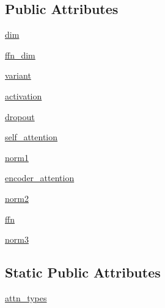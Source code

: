 \subsection*{Public Attributes}
\begin{DoxyCompactItemize}
\item 
\hyperlink{classparlai_1_1agents_1_1transformer_1_1modules_1_1TransformerDecoderLayer_afc3159ec4e88329e2967edf28923ea20}{dim}
\item 
\hyperlink{classparlai_1_1agents_1_1transformer_1_1modules_1_1TransformerDecoderLayer_a296aa88e8a31be628bb31f55de0a0360}{ffn\+\_\+dim}
\item 
\hyperlink{classparlai_1_1agents_1_1transformer_1_1modules_1_1TransformerDecoderLayer_a94a9a714a2585fd6a675a08643e3ce6b}{variant}
\item 
\hyperlink{classparlai_1_1agents_1_1transformer_1_1modules_1_1TransformerDecoderLayer_a33276633e128020853db98128f1d93c3}{activation}
\item 
\hyperlink{classparlai_1_1agents_1_1transformer_1_1modules_1_1TransformerDecoderLayer_aba87c66e402b0cfdf196872c3f038d43}{dropout}
\item 
\hyperlink{classparlai_1_1agents_1_1transformer_1_1modules_1_1TransformerDecoderLayer_ad656c203b5b2ab890ea419febace286f}{self\+\_\+attention}
\item 
\hyperlink{classparlai_1_1agents_1_1transformer_1_1modules_1_1TransformerDecoderLayer_aa82d4bae763a0867633b6d5bc8484129}{norm1}
\item 
\hyperlink{classparlai_1_1agents_1_1transformer_1_1modules_1_1TransformerDecoderLayer_a50be54030dc6526fd5cae1f48a448f04}{encoder\+\_\+attention}
\item 
\hyperlink{classparlai_1_1agents_1_1transformer_1_1modules_1_1TransformerDecoderLayer_ac581c47d531c120ca010ce5fa3836b24}{norm2}
\item 
\hyperlink{classparlai_1_1agents_1_1transformer_1_1modules_1_1TransformerDecoderLayer_a394248deb2cfa738a51f890d4c232224}{ffn}
\item 
\hyperlink{classparlai_1_1agents_1_1transformer_1_1modules_1_1TransformerDecoderLayer_a24e685c1a13c11ce7bd4a839bc93ab2a}{norm3}
\end{DoxyCompactItemize}
\subsection*{Static Public Attributes}
\begin{DoxyCompactItemize}
\item 
\hyperlink{classparlai_1_1agents_1_1transformer_1_1modules_1_1TransformerDecoderLayer_aae73c8122e4c7da619c05118630b1a03}{attn\+\_\+types}
\end{DoxyCompactItemize}


